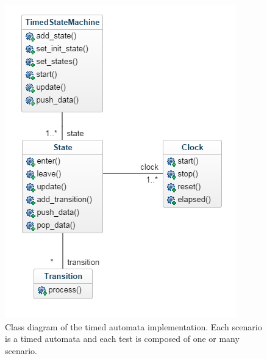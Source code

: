 \documentclass[12pt]{article}
\theoremstyle{definition}
\theoremstyle{definition}
\theoremstyle{remark}
\begin{document}
\begin{figure}
    \centering
    \includegraphics[scale=0.8]{class_diagram.png}
    \caption{Class diagram of the timed automata implementation. Each scenario is a timed automata and each test is composed of one or many scenario.}
    \label{class_diagram}
\end{figure}
\end{document}
